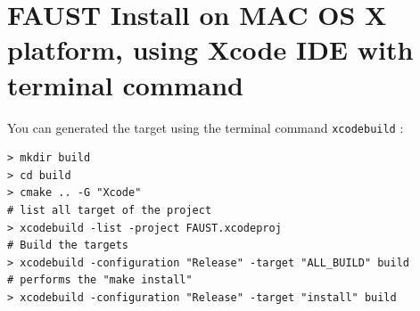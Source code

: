 \section{FAUST Install on MAC OS X platform, using Xcode IDE with terminal command}\label{sec:ANNEXEInstallMACXcodeTerminal}
You can generated the target using the terminal command \texttt{xcodebuild} :
\lstset{style=customBash}
\begin{lstlisting}
> mkdir build
> cd build
> cmake .. -G "Xcode"	
# list all target of the project
> xcodebuild -list -project FAUST.xcodeproj 	
# Build the targets
> xcodebuild -configuration "Release" -target "ALL_BUILD" build 	
# performs the "make install"
> xcodebuild -configuration "Release" -target "install" build 
\end{lstlisting}


